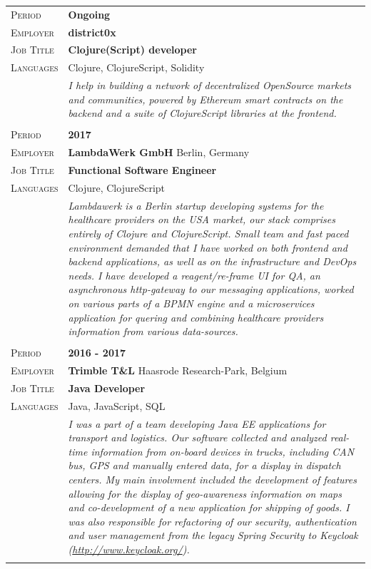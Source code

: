 \documentclass[a4paper, oneside, final]{scrartcl}
\newcommand{\gray}{\rowcolor[gray]{.90}}
\begin{document}
\begin{center}
\begin{tabularx}{0.97\linewidth}{>{\raggedleft\scshape}p{2cm}X}
\gray Period    & \textbf{Ongoing}\\
\gray Employer  & \textbf{district0x} \\
\gray Job Title & \textbf{Clojure(Script) developer}\\
\gray Languages & Clojure, ClojureScript, Solidity\\
\gray           &  {\it{I help in building a network of decentralized OpenSource markets and communities, powered by Ethereum smart contracts on the backend and a suite of ClojureScript libraries at the frontend.
}}\\ \\
\gray Period    & \textbf{2017}\\
\gray Employer  & \textbf{LambdaWerk GmbH} \hfill Berlin, Germany\\
\gray Job Title & \textbf{Functional Software Engineer}\\
\gray Languages & Clojure, ClojureScript\\
\gray           &  {\it{Lambdawerk is a Berlin startup developing systems for the healthcare providers on the USA market, our stack comprises entirely of Clojure and ClojureScript.
Small team and fast paced environment demanded that I have worked on both frontend and backend applications, as well as on the infrastructure and DevOps needs. 
I have developed a reagent/re-frame UI for QA, an asynchronous http-gateway to our messaging applications, worked on various parts of a BPMN engine and a microservices application for quering and combining healthcare providers information from various data-sources.
}}\\ \\
\gray Period    & \textbf{2016 - 2017}\\
\gray Employer  & \textbf{Trimble T\&L} \hfill Haasrode Research-Park, Belgium\\
\gray Job Title & \textbf{Java Developer}\\
\gray Languages & Java, JavaScript, SQL\\
\gray           &  {\it{I was a part of a team developing Java EE applications for transport and logistics. 
Our software collected and analyzed real-time information from on-board devices in trucks, including CAN bus, GPS and manually entered data, for a display in dispatch centers.
My main involvment included the development of features allowing for the display of geo-awareness information on maps and co-development of a new application for shipping of goods. I was also responsible for refactoring of our security, authentication and user management from the legacy Spring Security to Keycloak (\url{http://www.keycloak.org/}).}}\\ \\

\end{tabularx}
\end{center}
\end{document}

